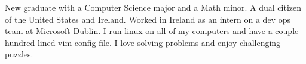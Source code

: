 

\begin{cvparagraph}

New graduate with a Computer Science major and a Math minor. A dual citizen of the United States and Ireland. Worked in Ireland as an intern on a dev ops team at Microsoft Dublin. I run linux on all of my computers and have a couple hundred lined vim config file. I love solving problems and enjoy challenging puzzles.
\end{cvparagraph}
